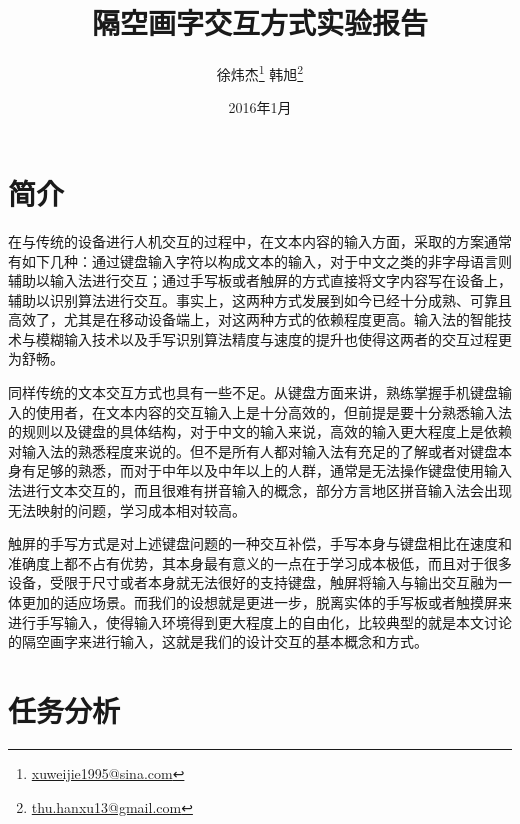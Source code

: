 \documentclass[10pt, twocolumn]{article}
\begin{document}
\title{\textsf{隔空画字交互方式实验报告}}

\author{
徐炜杰\thanks{\href{mailto:xuweijie1995@sina.com}{xuweijie1995@sina.com}}\quad
韩旭\thanks{\href{mailto:thu.hanxu13@gmail.com}{thu.hanxu13@gmail.com}}
}


\date{2016年1月}
\renewcommand{\contentsname}{\textbf{目录}}
\renewcommand{\figurename}{\textbf{图}}
\renewcommand{\tablename}{\textbf{表}}

\twocolumn[
  \begin{@twocolumnfalse}
	\maketitle
  \end{@twocolumnfalse}
]


\section{简介}

在与传统的设备进行人机交互的过程中，在文本内容的输入方面，采取的方案通常有如下几种：通过键盘输入字符以构成文本的输入，对于中文之类的非字母语言则辅助以输入法进行交互；通过手写板或者触屏的方式直接将文字内容写在设备上，辅助以识别算法进行交互。事实上，这两种方式发展到如今已经十分成熟、可靠且高效了，尤其是在移动设备端上，对这两种方式的依赖程度更高。输入法的智能技术与模糊输入技术以及手写识别算法精度与速度的提升也使得这两者的交互过程更为舒畅。

同样传统的文本交互方式也具有一些不足。从键盘方面来讲，熟练掌握手机键盘输入的使用者，在文本内容的交互输入上是十分高效的，但前提是要十分熟悉输入法的规则以及键盘的具体结构，对于中文的输入来说，高效的输入更大程度上是依赖对输入法的熟悉程度来说的。但不是所有人都对输入法有充足的了解或者对键盘本身有足够的熟悉，而对于中年以及中年以上的人群，通常是无法操作键盘使用输入法进行文本交互的，而且很难有拼音输入的概念，部分方言地区拼音输入法会出现无法映射的问题，学习成本相对较高。

触屏的手写方式是对上述键盘问题的一种交互补偿，手写本身与键盘相比在速度和准确度上都不占有优势，其本身最有意义的一点在于学习成本极低，而且对于很多设备，受限于尺寸或者本身就无法很好的支持键盘，触屏将输入与输出交互融为一体更加的适应场景。而我们的设想就是更进一步，脱离实体的手写板或者触摸屏来进行手写输入，使得输入环境得到更大程度上的自由化，比较典型的就是本文讨论的隔空画字来进行输入，这就是我们的设计交互的基本概念和方式。 


\section{任务分析}
\end{document}
